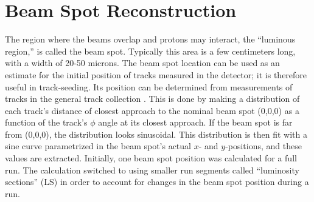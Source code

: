 


\section{Beam Spot Reconstruction}
\label{evReco:BS}
The region where the beams overlap and protons may interact, 
the ``luminous region,'' is called the beam spot.  
Typically this area is a few centimeters long, 
with a width of 20-50 microns.  %
The beam spot location can be used as an estimate 
for the initial position of tracks measured in the detector; 
it is therefore useful in track-seeding.  
Its position %
can be determined from measurements of tracks in the 
general track collection 
\cite{CMS-NOTE-2007-021}.  
This is done by making a distribution of each track's distance of 
closest approach to the nominal beam spot (0,0,0) 
as a function of the track's $\phi$ angle at its 
closest approach.  
If the beam spot is far from (0,0,0), 
the distribution looks sinusoidal.  
This distribution is then fit with a sine curve 
parametrized in the beam spot's actual 
$x$- and $y$-positions, 
and these values are extracted.  
Initially, one beam spot position was calculated    %
for a full run.  
The calculation switched to using smaller run segments 
called ``luminosity sections'' (LS) 
in order to account for changes in the beam spot position 
during a run.  

